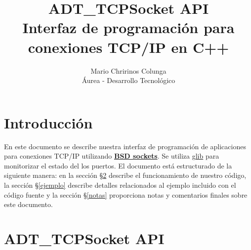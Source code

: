 \documentclass[a4paper,10pt]{article}
\title{ADT\_TCPSocket API\\ Interfaz de programación para conexiones TCP/IP en C++}
\author{Mario Chririnos Colunga\\ Áurea - Desarrollo Tecnológico}
\begin{document}
\maketitle

% 

\tableofcontents
\section{Introducción}
En este documento se describe nuestra interfaz de programación de aplicaciones para conexiones TCP/IP utilizando \textbf{\href{http://en.wikipedia.org/wiki/Berkeley\_sockets}{BSD sockets}}. Se utiliza \href{http://library.gnome.org/devel/glib/}{glib} para monitorizar el estado del los puertos. El documento está estructurado de la siguiente manera: en la sección \S\ref{api} describe el funcionamiento de nuestro código, la sección \S\ref{ejemplo} describe detalles relacionados al ejemplo incluido con el código fuente y la sección \S\ref{notas} proporciona notas y comentarios finales sobre este documento. 

\section{ADT\_TCPSocket API}
\label{api}
\end{document}

